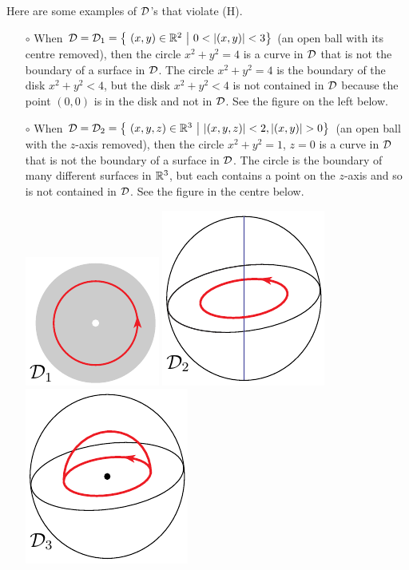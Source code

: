 \begin{eg}\label{ex:COhomology}
Here are some examples of $\mathcal{D}$'s that violate (H). 

\begin{itemize}\itemsep5pt \parskip0pt  %
\item[$\circ$]
When $\cD=\cD_1=\big\{\ (x,y)\in\bbbr^2\ \big|\ 0<|(x,y)|<3\big\}$ 
(an open ball with its centre removed), then
the circle $x^2+y^2=4$ is a curve in $\mathcal{D}$ that is not the boundary 
of a surface in $\mathcal{D}$. The circle $x^2+y^2=4$ is the boundary of 
the disk $x^2+y^2<4$, but the disk $x^2+y^2<4$ is not contained in 
$\mathcal{D}$ because the point $(0,0)$ is in the disk and not in $\mathcal{D}$. 
See the figure on the left below.

\item[$\circ$] 
When $\cD=\cD_2
   =\big\{\ (x,y,z)\in\bbbr^3\ \big|\ |(x,y,z)|<2, |(x,y)|>0\big\}$
(an open ball with the $z$-axis removed), then 
the circle $x^2+y^2=1$, $z=0$ is a curve in $\mathcal{D}$ that is not the boundary 
of a surface in $\mathcal{D}$. The circle is the boundary of many different 
surfaces in $\mathbb{R}^3$, but each contains a point on the $z$-axis and 
so is  not contained in $\mathcal{D}$. See the figure in the centre below.

\begin{efig}
\begin{center}
    \includegraphics{pDisk.pdf}\qquad\quad
    \includegraphics{lSphere.pdf}\qquad\quad
    \includegraphics{pSphere.pdf}\qquad
\end{center}
\end{efig}



\end{itemize}
\end{eg}
